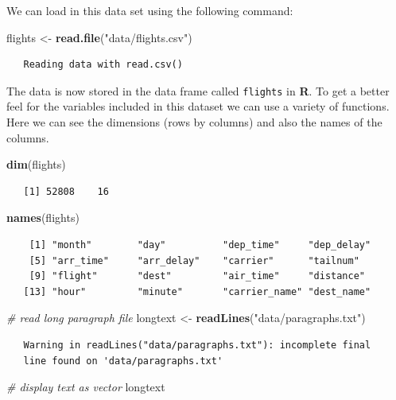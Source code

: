 \documentclass[12pt, twoside]{amherstthesis}
\newenvironment{Shaded}{\begin{snugshade}}{\end{snugshade}}
\newcommand{\CommentTok}[1]{\textcolor[rgb]{0.56,0.35,0.01}{\textit{#1}}}
\newcommand{\KeywordTok}[1]{\textcolor[rgb]{0.13,0.29,0.53}{\textbf{#1}}}
\newcommand{\NormalTok}[1]{#1}
\newcommand{\StringTok}[1]{\textcolor[rgb]{0.31,0.60,0.02}{#1}}
\theoremstyle{definition}
\theoremstyle{definition}
\theoremstyle{definition}
\theoremstyle{remark}
\begin{document}
We can load in this data set using the following command:
\begin{Shaded}
\begin{Highlighting}[]
\NormalTok{flights <-}\StringTok{ }\KeywordTok{read.file}\NormalTok{(}\StringTok{"data/flights.csv"}\NormalTok{)}
\end{Highlighting}
\end{Shaded}
\begin{verbatim}
   Reading data with read.csv()
\end{verbatim}
The data is now stored in the data frame called \texttt{flights} in \textbf{R}. To get a better feel for the variables included in this dataset we can use a variety of functions. Here we can see the dimensions (rows by columns) and also the names of the columns.
\begin{Shaded}
\begin{Highlighting}[]
\KeywordTok{dim}\NormalTok{(flights)}
\end{Highlighting}
\end{Shaded}
\begin{verbatim}
   [1] 52808    16
\end{verbatim}
\begin{Shaded}
\begin{Highlighting}[]
\KeywordTok{names}\NormalTok{(flights)}
\end{Highlighting}
\end{Shaded}
\begin{verbatim}
    [1] "month"        "day"          "dep_time"     "dep_delay"   
    [5] "arr_time"     "arr_delay"    "carrier"      "tailnum"     
    [9] "flight"       "dest"         "air_time"     "distance"    
   [13] "hour"         "minute"       "carrier_name" "dest_name"
\end{verbatim}
\begin{Shaded}
\begin{Highlighting}[]
\CommentTok{# read long paragraph file}
\NormalTok{longtext <-}\StringTok{ }\KeywordTok{readLines}\NormalTok{(}\StringTok{"data/paragraphs.txt"}\NormalTok{)}
\end{Highlighting}
\end{Shaded}
\begin{verbatim}
   Warning in readLines("data/paragraphs.txt"): incomplete final
   line found on 'data/paragraphs.txt'
\end{verbatim}
\begin{Shaded}
\begin{Highlighting}[]
\CommentTok{# display text as vector}
\NormalTok{longtext}
\end{Highlighting}
\end{Shaded}
\end{document}
